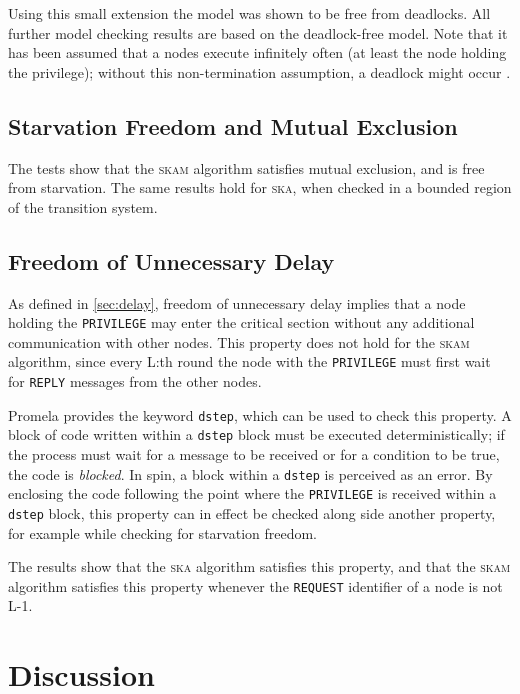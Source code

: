 \documentclass[a4paper,10pt]{llncs}
\begin{document}
Using this small extension the model was shown to be free from deadlocks. All further model checking results are based on the deadlock-free model. Note that it has been assumed that a nodes execute infinitely often (at least the node holding the privilege); without this non-termination assumption, a deadlock might occur  \cite{OgataSAL}\cite{OgataMaude}.

\subsection{Starvation Freedom and Mutual Exclusion}
The tests show that the \textsc{skam} algorithm satisfies mutual exclusion, and is free from starvation. The same results hold for \textsc{ska}, when checked in a bounded region of the transition system.

\subsection{Freedom of Unnecessary Delay}
As defined in \ref{sec:delay}, freedom of unnecessary delay implies that a node holding the \texttt{PRIVILEGE} may enter the critical section without any additional communication with other nodes. This property does not hold for the \textsc{skam} algorithm, since every L:th round the node with the \texttt{PRIVILEGE} must first wait for \texttt{REPLY} messages from the other nodes.

Promela provides the keyword \texttt{dstep}, which can be used to check this property. A block of code written within a \texttt{dstep} block must be executed deterministically; if the process must wait for a message to be received or for a condition to be true, the code is \emph{blocked}. In spin, a block within a \texttt{dstep} is perceived as an error. By enclosing the code following the point where the \texttt{PRIVILEGE} is received within a \texttt{dstep} block, this property can in effect be checked along side another property, for example while checking for starvation freedom.

The results show that the \textsc{ska} algorithm satisfies this property, and that the \textsc{skam} algorithm satisfies this property whenever the \texttt{REQUEST} identifier of a node is not L-1.

\section{Discussion}
\end{document}
